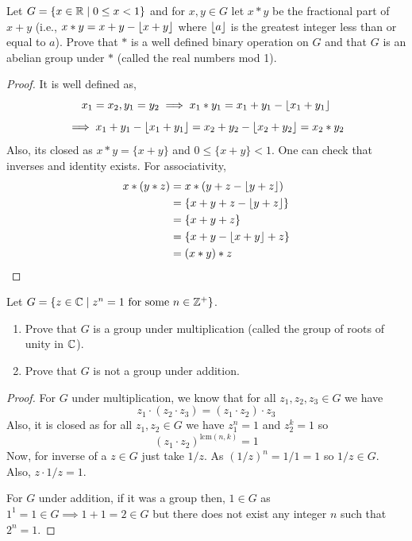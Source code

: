 \begin{problem}
    Let $G = \{x \in \mathbb{R} \mid 0 \le x < 1\}$ and for $x, y \in G$ let $x*y$ be the fractional part of $x+y$ 
    (i.e., $x*y = x+y - \left\lfloor x+y \right\rfloor$ where $\left\lfloor a \right\rfloor$ is the greatest integer less than or equal to $a$).
    Prove that $*$ is a well defined binary operation on $G$ and that $G$ is an abelian group under $*$ (called the real numbers mod 1).
\end{problem}

\begin{proof}
    It is well defined as,
    \[ x_1 = x_2, y_1 = y_2 \implies x_1*y_1 = x_1+y_1-\left\lfloor x_1+y_1 \right\rfloor\]
    \[ \implies x_1+y_1-\left\lfloor x_1+y_1 \right\rfloor=x_2+y_2 - \left\lfloor x_2+y_2 \right\rfloor = x_2 * y_2 \]
    Also, its closed as $x*y = \{x+y\}$ and $0 \le \{x+y\} < 1$. One can check that inverses and identity exists. For associativity,
    \begin{align*}
        x*(y*z) &= x*(y+z-\left\lfloor y+z \right\rfloor) \\
        &= \{x+y+z - \left\lfloor y+z \right\rfloor\} \\
        &= \{ x+y+z \} \\
        &= \{ x+y-\left\lfloor x+y \right\rfloor+z \} \\
        &= (x*y)*z
    \end{align*}
\end{proof}

\begin{problem}
    Let $G = \{z \in \mathbb{C} \mid z^n = 1 \text{ for some } n \in \mathbb{Z}^+\}$.
    \begin{enumerate}
        \item Prove that $G$ is a group under multiplication (called the group of roots of unity in $\mathbb{C}$).
        \item Prove that $G$ is not a group under addition.
    \end{enumerate}
\end{problem}

\begin{proof}
    For $G$ under multiplication, we know that for all $z_1,z_2,z_3 \in G$ we have
    \[ z_1 \cdot (z_2 \cdot z_3) = (z_1 \cdot z_2) \cdot z_3 \]
    Also, it is closed as for all $z_1, z_2 \in G$ we have $z_1^n=1$ and $z_2^k=1$ so 
    \[ (z_1 \cdot z_2)^{\text{lcm}(n,k)}=1 \]
    Now, for inverse of a $z \in G$ just take $1/z$. As $(1/z)^n=1/1=1$ so $1/z \in G$. Also, $z \cdot 1/z = 1$.

    For $G$ under addition, if it was a group then, $1 \in G$ as $1^1 = 1 \in G \implies 1+1 = 2 \in G$ but there does not exist any integer
    $n$ such that $2^n=1$.   
\end{proof}

